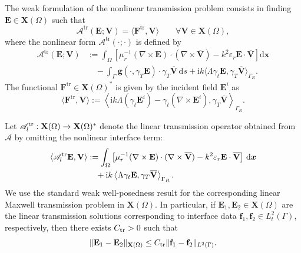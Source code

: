 \documentclass[12pt,reqno]{amsart}
\theoremstyle{definition}
\numberwithin{equation}{section}
\begin{document}
The weak formulation of the nonlinear transmission problem consists in finding $\mathbf{E} \in \mathbf{X}(\Omega)$ such that
\[
\mathcal{A}^{\mathrm{tr}}(\mathbf{E}; \mathbf{V}) = \langle \mathbf{F}^{\mathrm{tr}}, \mathbf{V} \rangle \qquad \forall \mathbf{V} \in \mathbf{X}(\Omega),
\]
where the nonlinear form $\mathcal{A}^{\mathrm{tr}}(\cdot; \cdot)$ is defined by
\begin{equation}\label{eq:alternative_form}
\begin{aligned}
\mathcal{A}^{\mathrm{tr}}(\mathbf{E}; \mathbf{V}) &:= \int_{\Omega} \left[ \mu_r^{-1}(\nabla \times \mathbf{E}) \cdot (\nabla \times \overline{\mathbf{V}}) - k^2 \varepsilon_r \mathbf{E} \cdot \overline{\mathbf{V}} \right] \mathrm{d}\boldsymbol{x} \\
&\quad - \int_{\Gamma} \mathbf{g}(\cdot, \gamma_T \mathbf{E}) \cdot \gamma_T \overline{\mathbf{V}} \,\mathrm{d}s + \mathrm{i}k \langle \Lambda \gamma_t \mathbf{E}, \gamma_T \overline{\mathbf{V}} \rangle_{\Gamma_R}.
\end{aligned}
\end{equation}
The functional $\mathbf{F}^{\mathrm{tr}} \in \mathbf{X}(\Omega)^*$ is given by the incident field $\mathbf{E}^i$ as
\[
\langle \mathbf{F}^{\mathrm{tr}}, \mathbf{V} \rangle := \left\langle \mathrm{i}k \Lambda (\gamma_t \mathbf{E}^i) - \gamma_t (\nabla \times \mathbf{E}^i), \gamma_T \overline{\mathbf{V}} \right\rangle_{\Gamma_R}.
\]



Let \(\mathscr A_l^{\rm tr}:\mathbf X(\Omega)\to\mathbf X(\Omega)^*\) denote the
linear transmission operator obtained from \(\mathcal A\) by omitting the
nonlinear interface term:
\[
\begin{aligned}
\langle \mathscr  A_l^{\rm tr}\mathbf E,\mathbf V\rangle
&:=
\int_\Omega
\left[
\mu_r^{-1}(\nabla\times\mathbf E)
\cdot(\nabla\times\overline{\mathbf V})
-
k^2\varepsilon_r\mathbf E\cdot\overline{\mathbf V}
\right]\,\mathrm d\boldsymbol{x}
\\
&\quad
+
\mathrm i k
\left\langle
\Lambda\gamma_t\mathbf E,
\gamma_T\overline{\mathbf V}
\right\rangle_{\Gamma_R}.
\end{aligned}
\]
We use the standard weak well-posedness result for the corresponding linear
Maxwell transmission problem in \(\mathbf X(\Omega)\). In particular, if
\(\mathbf E_1,\mathbf E_2\in\mathbf X(\Omega)\) are the linear transmission
solutions corresponding to interface data
\(\mathbf f_1,\mathbf f_2\in L_t^2(\Gamma)\), respectively, then there exists
\(C_{\rm tr}>0\) such that
\begin{equation}\label{eq:linear_transmission_stability}
\|\mathbf E_1-\mathbf E_2\|_{\mathbf X(\Omega)}
\le
C_{\rm tr}
\|\mathbf f_1-\mathbf f_2\|_{L^2(\Gamma)} .
\end{equation}
\end{document}
